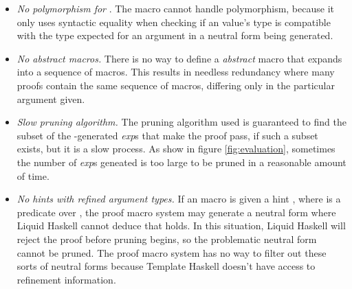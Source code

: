 \begin{itemize}
  \item \textit{No polymorphism for }. The  macro cannot
  handle polymorphism, because it only uses syntactic equality when checking if
  an value's type is compatible with the type expected for an argument in a
  neutral form being generated.
  
  \item \textit{No abstract macros.} There is no way to define a
  \textit{abstract} macro that expands into a sequence of macros. This results
  in needless redundancy where many proofs contain the same sequence of macros,
  differing only in the particular argument given.
  
  \item \textit{Slow pruning algorithm.} The pruning algorithm used is
  guaranteed to find the subset of the -generated \textit{exp}s that
  make the proof pass, if such a subset exists, but it is a slow process. As
  show in figure \ref{fig:evaluation}, sometimes the number of \textit{exp}s
  geneated is too large to be pruned in a reasonable amount of time. 
  
  \item \textit{No  hints with refined argument types.} If an 
  macro is given a hint , where  is
  a predicate over , the proof macro system may generate a neutral form
   where Liquid Haskell cannot deduce that  holds. In this
  situation, Liquid Haskell will reject the proof before pruning begins, so the
  problematic neutral form cannot be pruned. The proof macro system has no way
  to filter out these sorts of neutral forms because Template Haskell doesn't
  have access to refinement information.
\end{itemize}